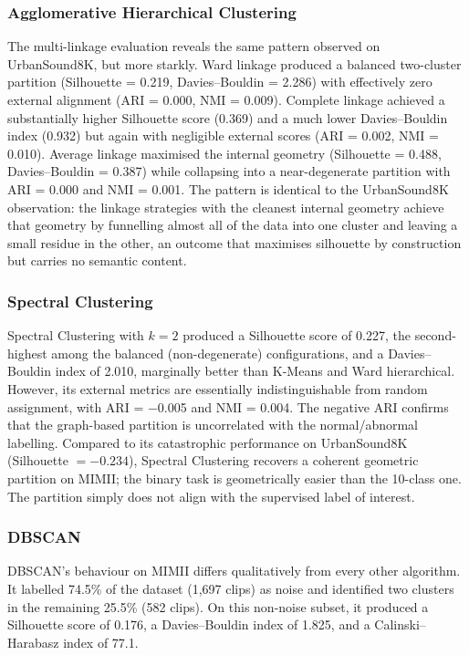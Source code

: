 \documentclass[runningheads,a4paper,11pt]{report}
\begin{document}
\subsubsection{Agglomerative Hierarchical Clustering}

The multi-linkage evaluation reveals the same pattern observed on UrbanSound8K, but more starkly. Ward linkage produced a balanced two-cluster partition (Silhouette = 0.219, Davies--Bouldin = 2.286) with effectively zero external alignment (ARI = 0.000, NMI = 0.009). Complete linkage achieved a substantially higher Silhouette score (0.369) and a much lower Davies--Bouldin index (0.932) but again with negligible external scores (ARI = 0.002, NMI = 0.010). Average linkage maximised the internal geometry (Silhouette = 0.488, Davies--Bouldin = 0.387) while collapsing into a near-degenerate partition with ARI = 0.000 and NMI = 0.001. The pattern is identical to the UrbanSound8K observation: the linkage strategies with the cleanest internal geometry achieve that geometry by funnelling almost all of the data into one cluster and leaving a small residue in the other, an outcome that maximises silhouette by construction but carries no semantic content.

\subsubsection{Spectral Clustering}

Spectral Clustering with $k = 2$ produced a Silhouette score of 0.227, the second-highest among the balanced (non-degenerate) configurations, and a Davies--Bouldin index of 2.010, marginally better than K-Means and Ward hierarchical. However, its external metrics are essentially indistinguishable from random assignment, with ARI = $-$0.005 and NMI = 0.004. The negative ARI confirms that the graph-based partition is uncorrelated with the normal/abnormal labelling. Compared to its catastrophic performance on UrbanSound8K (Silhouette $= -0.234$), Spectral Clustering recovers a coherent geometric partition on MIMII; the binary task is geometrically easier than the 10-class one. The partition simply does not align with the supervised label of interest.

\subsubsection{DBSCAN}

DBSCAN's behaviour on MIMII differs qualitatively from every other algorithm. It labelled 74.5\% of the dataset (1,697 clips) as noise and identified two clusters in the remaining 25.5\% (582 clips). On this non-noise subset, it produced a Silhouette score of 0.176, a Davies--Bouldin index of 1.825, and a Calinski--Harabasz index of 77.1.
\end{document}
